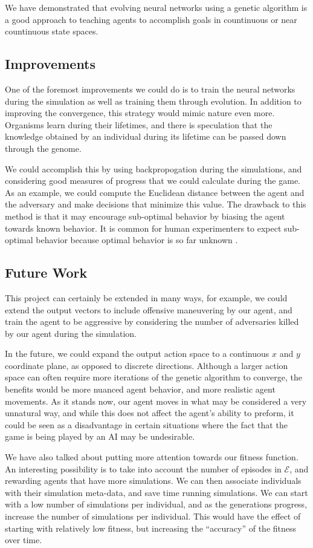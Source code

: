 \documentclass{article}
\begin{document}
We have demonstrated that evolving neural networks using a genetic algorithm is
a good approach to teaching agents to accomplish goals in countinuous or near
countinuous state spaces.  

\subsection{Improvements}\label{sec:improvements}
One of the foremost improvements we could do is to train the neural networks
during the simulation as well as training them through evolution. In addition to
improving the convergence, this strategy would mimic nature even more.
Organisms learn during their lifetimes, and there is speculation that the
knowledge obtained by an individual during its lifetime can be passed down
through the genome.

We could accomplish this by using backpropogation during the simulations, and
considering good measures of progress that we could calculate during the
game. As an example, we could compute the Euclidean distance between the agent
and the adversary and make decisions that minimize this value. The drawback to
this method is that it may encourage sub-optimal behavior by biasing the agent
towards known behavior. It is common for human experimenters to expect
sub-optimal behavior because optimal behavior is so far unknown \cite{lehman}.

\subsection{Future Work}
This project can certainly be extended in many ways, for example, we could
extend the output vectors to include offensive maneuvering by our agent, and
train the agent to be aggressive by considering the number of adversaries killed
by our agent during the simulation.

In the future, we could expand the output action space to a continuous $x$ and
$y$ coordinate plane, as opposed to discrete directions. Although a larger
action space can often require more iterations of the genetic algorithm to
converge, the benefits would be more nuanced agent behavior, and more realistic
agent movements. As it stands now, our agent moves in what may be considered a
very unnatural way, and while this does not affect the agent's ability to
preform, it could be seen as a disadvantage in certain situations where the fact
that the game is being played by an AI may be undesirable.

We have also talked about putting more attention towards our fitness
function. An interesting possibility is to take into account the number of
episodes in $\bm{\mathcal{E}}$, and rewarding agents that have more
simulations. We can then associate individuals with their simulation meta-data,
and save time running simulations. We can start with a low number of simulations
per individual, and as the generations progress, increase the number of
simulations per individual. This would have the effect of starting with
relatively low fitness, but increasing the ``accuracy'' of the fitness over
time.
\end{document}
